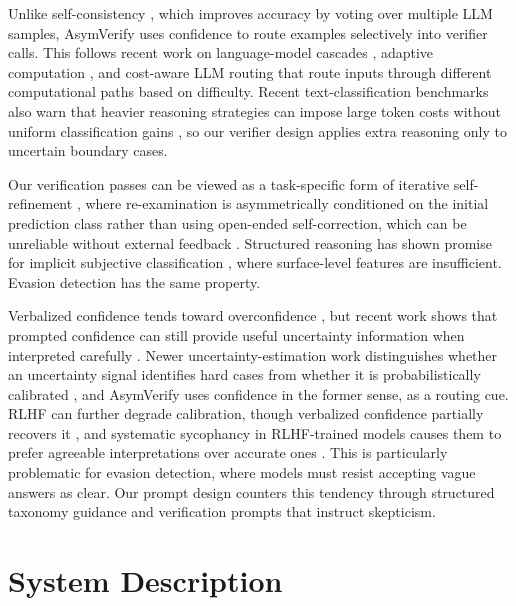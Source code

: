 \documentclass[11pt]{article}
\newcommand{\rev}[1]{#1}
\begin{document}
Unlike self-consistency \citep{wang2023selfconsistency}, which improves accuracy by voting over multiple LLM samples, AsymVerify uses confidence to route examples selectively into verifier calls. This follows recent work on language-model cascades \citep{gupta2024lmcascades}, adaptive computation \citep{schuster2022calm}, and cost-aware LLM routing \citep{chen2023frugalgpt} that route inputs through different computational paths based on difficulty. Recent text-classification benchmarks also warn that heavier reasoning strategies can impose large token costs without uniform classification gains \citep{guo2026textreasoningbench}, so our verifier design applies extra reasoning only to uncertain boundary cases.

Our verification passes can be viewed as a task-specific form of iterative self-refinement \citep{madaan2023selfrefine,shinn2023reflexion}, where re-examination is asymmetrically conditioned on the initial prediction class rather than using open-ended self-correction, which can be unreliable without external feedback \citep{huang2024selfcorrect}. Structured reasoning has shown promise for implicit subjective classification \citep{sun2023textclassification,fei2023reasoning}, where surface-level features are insufficient. Evasion detection has the same property.

Verbalized confidence tends toward overconfidence \citep{groot2024overconfidence}, but recent work shows that prompted confidence can still provide useful uncertainty information when interpreted carefully \citep{xiong2024uncertainty,huang2024rankcalibration}. Newer uncertainty-estimation work distinguishes whether an uncertainty signal identifies hard cases from whether it is probabilistically calibrated \citep{li2025harmonized}, and AsymVerify uses confidence in the former sense, as a routing cue. RLHF can further degrade calibration, though verbalized confidence partially recovers it \citep{tian2023calibration}, and systematic sycophancy in RLHF-trained models causes them to prefer agreeable interpretations over accurate ones \citep{sharma2024sycophancy}. This is particularly problematic for evasion detection, where models must resist accepting vague answers as clear. Our prompt design \rev{counters} this tendency through structured taxonomy guidance and verification prompts that instruct skepticism.

\section{System Description}
\end{document}

